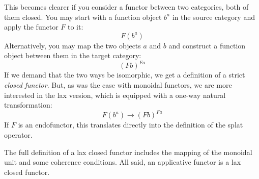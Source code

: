 \documentclass[DaoFP]{subfiles}
\begin{document}
This becomes clearer if you consider a functor between two categories, both of them closed. You may start with a function object $b^a$ in the source category and apply the functor $F$ to it:
\[ F (b^a) \]
Alternatively, you may map the two objects $a$ and $b$ and construct a function object between them in the target category:
\[ (F b)^{F a} \]
If we demand that the two ways be isomorphic, we get a definition of a strict \emph{closed functor}. But, as was the case with monoidal functors, we are more interested in the lax version, which is equipped with a one-way natural transformation:
\[ F (b^a) \to (F b)^{F a} \]
If $F$ is an endofunctor, this translates directly into the definition of the splat operator. 

The full definition of a lax closed functor includes the mapping of the monoidal unit and some coherence conditions. All said, an applicative functor is a lax closed functor.
\end{document}
